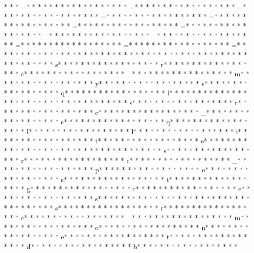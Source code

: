 * *  * =* * *  * * *  * * *  *  * * *  *  * * *  * =* * *  * * *  * * *  *  * * *  *  * * *  * =* * *  * * *  * * *  *  * * *  *  * * *  * =* * *  * * *  * * *  *  * * *  *  * * *  * =* * *  * * *  * * *  *  * * *  *  * * *  * =* * *  * * *  * * *  *  * * *  *  * * *  * =* * *  * * *  * * *  *  * * *  *  * * *  * =* * *  * * *  * * *  *  * * *  *  * * *  * =* * *  * * *  * * *  *  * * *  *  * * *  * =* * *  * * *  * * *  *  * * *  *  * * *  * =* * *  * * *  * * *  *  * * *  *  * * *  * =* * *  * * *  * * *  *  * * *  *  * * *  * %
* * *  * * *  * * *  *  * * *  *  * * *  * 
* * *  * * *  * * *  *  * * *  *  * * *  * s* * *  * * *  * * *  *  * * *  *  * * *  * r* * *  * * *  * * *  *  * * *  *  * * *  * c* * *  * * *  * * *  *  * * *  *  * * *  * _* * *  * * *  * * *  *  * * *  *  * * *  * m* * *  * * *  * * *  *  * * *  *  * * *  * y* * *  * * *  * * *  *  * * *  *  * * *  * s* * *  * * *  * * *  *  * * *  *  * * *  * q* * *  * * *  * * *  *  * * *  *  * * *  * l* * *  * * *  * * *  *  * * *  *  * * *  * 
* * *  * * *  * * *  *  * * *  *  * * *  * s* * *  * * *  * * *  *  * * *  *  * * *  * r* * *  * * *  * * *  *  * * *  *  * * *  * c* * *  * * *  * * *  *  * * *  *  * * *  * _* * *  * * *  * * *  *  * * *  *  * * *  * s* * *  * * *  * * *  *  * * *  *  * * *  * q* * *  * * *  * * *  *  * * *  *  * * *  * l* * *  * * *  * * *  *  * * *  *  * * *  * l* * *  * * *  * * *  *  * * *  *  * * *  * i* * *  * * *  * * *  *  * * *  *  * * *  * t* * *  * * *  * * *  *  * * *  *  * * *  * e* * *  * * *  * * *  *  * * *  *  * * *  * 
* * *  * * *  * * *  *  * * *  *  * * *  * s* * *  * * *  * * *  *  * * *  *  * * *  * r* * *  * * *  * * *  *  * * *  *  * * *  * c* * *  * * *  * * *  *  * * *  *  * * *  * _* * *  * * *  * * *  *  * * *  *  * * *  * p* * *  * * *  * * *  *  * * *  *  * * *  * o* * *  * * *  * * *  *  * * *  *  * * *  * s* * *  * * *  * * *  *  * * *  *  * * *  * t* * *  * * *  * * *  *  * * *  *  * * *  * g* * *  * * *  * * *  *  * * *  *  * * *  * r* * *  * * *  * * *  *  * * *  *  * * *  * e* * *  * * *  * * *  *  * * *  *  * * *  * s* * *  * * *  * * *  *  * * *  *  * * *  * 
* * *  * * *  * * *  *  * * *  *  * * *  * s* * *  * * *  * * *  *  * * *  *  * * *  * r* * *  * * *  * * *  *  * * *  *  * * *  * c* * *  * * *  * * *  *  * * *  *  * * *  * _* * *  * * *  * * *  *  * * *  *  * * *  * m* * *  * * *  * * *  *  * * *  *  * * *  * o* * *  * * *  * * *  *  * * *  *  * * *  * n* * *  * * *  * * *  *  * * *  *  * * *  * e* * *  * * *  * * *  *  * * *  *  * * *  * t* * *  * * *  * * *  *  * * *  *  * * *  * d* * *  * * *  * * *  *  * * *  *  * * *  * b* * *  * * *  * * *  *  * * *  *  * * *  * 
